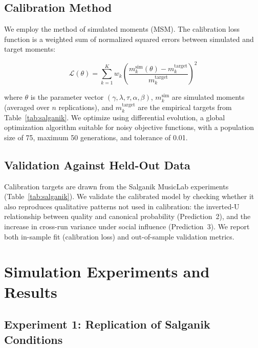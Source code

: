 \documentclass[11pt,a4paper]{article}
\begin{document}
\subsection{Calibration Method}

We employ the method of simulated moments (MSM). The calibration loss function is a weighted sum of normalized squared errors between simulated and target moments:

\begin{equation}
\mathcal{L}(\theta) = \sum_{k=1}^{K} w_k \left(\frac{m_k^{\text{sim}}(\theta) - m_k^{\text{target}}}{m_k^{\text{target}}}\right)^2
\end{equation}

\noindent where $\theta$ is the parameter vector $(\gamma, \lambda, \tau, \alpha, \beta)$, $m_k^{\text{sim}}$ are simulated moments (averaged over $n$ replications), and $m_k^{\text{target}}$ are the empirical targets from Table~\ref{tab:salganik}. We optimize using differential evolution, a global optimization algorithm suitable for noisy objective functions, with a population size of 75, maximum 50 generations, and tolerance of 0.01.

\subsection{Validation Against Held-Out Data}

Calibration targets are drawn from the Salganik MusicLab experiments (Table~\ref{tab:salganik}). We validate the calibrated model by checking whether it also reproduces qualitative patterns not used in calibration: the inverted-U relationship between quality and canonical probability (Prediction~2), and the increase in cross-run variance under social influence (Prediction~3). We report both in-sample fit (calibration loss) and out-of-sample validation metrics.

\section{Simulation Experiments and Results}
\label{sec:results}

\subsection{Experiment 1: Replication of Salganik Conditions}
\end{document}
